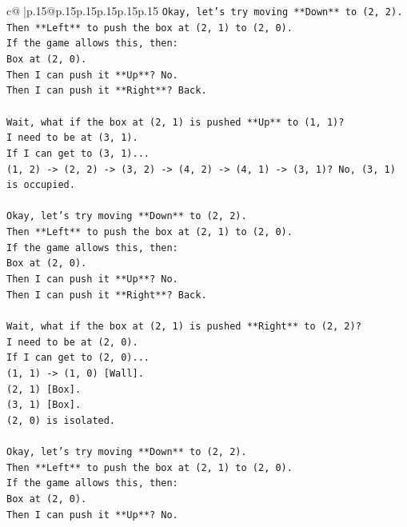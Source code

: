 \documentclass{article}
\begin{document}
{\begin{supertabular}{c@{$\;$}|p{.15\linewidth}@{}p{.15\linewidth}p{.15\linewidth}p{.15\linewidth}p{.15\linewidth}p{.15\linewidth}}
{{{\texttt{Okay, let's try moving **Down** to (2, 2).} \\
\texttt{Then **Left** to push the box at (2, 1) to (2, 0).} \\
\texttt{If the game allows this, then:} \\
\texttt{Box at (2, 0).} \\
\texttt{Then I can push it **Up**? No.} \\
\texttt{Then I can push it **Right**? Back.} \\
\\ 
\texttt{Wait, what if the box at (2, 1) is pushed **Up** to (1, 1)?} \\
\texttt{I need to be at (3, 1).} \\
\texttt{If I can get to (3, 1)...} \\
\texttt{(1, 2) {-}> (2, 2) {-}> (3, 2) {-}> (4, 2) {-}> (4, 1) {-}> (3, 1)? No, (3, 1) is occupied.} \\
\\ 
\texttt{Okay, let's try moving **Down** to (2, 2).} \\
\texttt{Then **Left** to push the box at (2, 1) to (2, 0).} \\
\texttt{If the game allows this, then:} \\
\texttt{Box at (2, 0).} \\
\texttt{Then I can push it **Up**? No.} \\
\texttt{Then I can push it **Right**? Back.} \\
\\ 
\texttt{Wait, what if the box at (2, 1) is pushed **Right** to (2, 2)?} \\
\texttt{I need to be at (2, 0).} \\
\texttt{If I can get to (2, 0)...} \\
\texttt{(1, 1) {-}> (1, 0) {[}Wall{]}.} \\
\texttt{(2, 1) {[}Box{]}.} \\
\texttt{(3, 1) {[}Box{]}.} \\
\texttt{(2, 0) is isolated.} \\
\\ 
\texttt{Okay, let's try moving **Down** to (2, 2).} \\
\texttt{Then **Left** to push the box at (2, 1) to (2, 0).} \\
\texttt{If the game allows this, then:} \\
\texttt{Box at (2, 0).} \\
\texttt{Then I can push it **Up**? No.} \\
}}}
\end{supertabular}}
\end{document}
